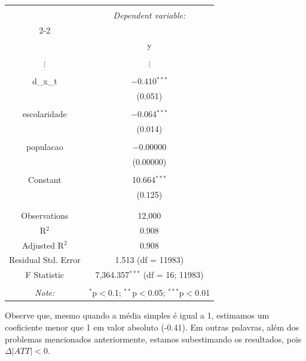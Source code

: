 \documentclass[portugues]{article}
\begin{document}
\begin{boxA}
   \begingroup
        \fontsize{8pt}{12pt}\selectfont
        \begin{center}
         \begin{tabular}{@{\extracolsep{5pt}}cc} 
         \\[-1.8ex]\hline 
         \hline \\[-1.8ex] 
          & \multicolumn{1}{c}{\textit{Dependent variable:}} \\ 
         \cline{2-2} 
         \\[-1.8ex] & y \\ 
         \hline \\[-1.8ex] 
            $\vdots$ & $\vdots$ \\
            & \\
          d\_x\_t & $-$0.410$^{***}$ \\ 
           & (0.051) \\ 
           & \\ 
          escolaridade & $-$0.064$^{***}$ \\ 
           & (0.014) \\ 
           & \\ 
          populacao & $-$0.00000 \\ 
           & (0.00000) \\ 
           & \\ 
          Constant & 10.664$^{***}$ \\ 
           & (0.125) \\ 
           & \\ 
         \hline \\[-1.8ex] 
         Observations & 12,000 \\ 
         R$^{2}$ & 0.908 \\ 
         Adjusted R$^{2}$ & 0.908 \\ 
         Residual Std. Error & 1.513 (df = 11983) \\ 
         F Statistic & 7,364.357$^{***}$ (df = 16; 11983) \\ 
         \hline 
         \hline \\[-1.8ex] 
                 \textit{Note:}  & \multicolumn{1}{r}{$^{*}$p$<$0.1; $^{**}$p$<$0.05; $^{***}$p$<$0.01} \\
            \end{tabular} 
        \end{center}
     \endgroup
     
Observe que, mesmo quando a média simples é igual a 1, estimamos um coeficiente menor que 1 em valor absoluto (-0.41). Em outras palavras, além dos problemas mencionados anteriormente, estamos subestimando os resultados, pois $\Delta |ATT| < 0$.

\end{boxA}
\end{document}
